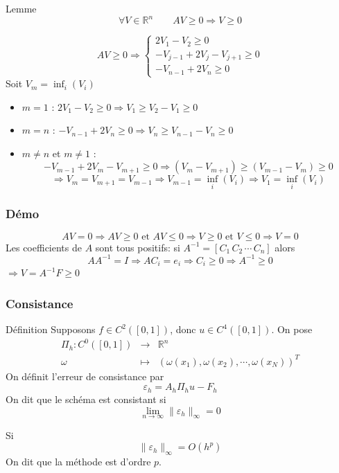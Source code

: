 \documentclass{beamer}
\begin{document}
 \begin{frame}

\begin{block}{Lemme}
\[\forall V \in \mathbb{R}^n\qquad AV\geq 0 \Longrightarrow V\geq 0\]
\end{block}
\[  AV\geq 0 \Longrightarrow
 \left\{
 \begin{array}{l}
2V_1-V_2\geq 0\\
-V_{j-1}+2V_j-V_{j+1}\geq 0\\
-V_{n-1}+2V_n\geq 0
\end{array}
\right.
 \]
Soit $V_m=\inf_i(V_i)$
\begin{itemize}
\item $m=1$ : $2V_1-V_2\geq 0 \Longrightarrow V_1\geq V_2-V_1\geq 0 $
\item $m=n$ : $-V_{n-1}+2V_n \geq 0 \Longrightarrow V_n\geq V_{n-1}-V_n\geq 0 $
\item $m\neq n$ et $m \neq 1$ : 
\[-V_{m-1}+2V_m-V_{m+1}\geq 0  \Longrightarrow (V_m-V_{m+1})\geq (V_{m-1}-V_m)\geq 0\]
\[ \Longrightarrow V_m=V_{m+1}=V_{m-1} \Longrightarrow V_{m-1}=\inf_i(V_i)\Longrightarrow V_1=\inf_i(V_i)\]
\end{itemize}


\end{frame}

\begin{frame}
  \frametitle{Démo}
  \[AV=0 \Longrightarrow AV\geq 0 \mbox { et } AV\leq 0\Longrightarrow V\geq 0 \mbox { et } V\leq 0\Longrightarrow V=0\]
  Les coefficients de $A$ sont tous positifs: si $A^{-1}=[C_1\,C_2\,\cdots\,C_n]$ alors
  \[ A A^{-1}=I  \Longrightarrow A C_i =e_i \Longrightarrow C_i\geq 0 \Longrightarrow  A^{-1}\geq 0 \]
  $\Longrightarrow V = A^{-1}F\geq 0$
  
  
 \end{frame} 
  
  \begin{frame}
  \frametitle{Consistance}
  \begin{block}{Définition}
  Supposons $f\in C^2([0,1])$, donc $u\in C^4([0,1])$. On pose
  \[\begin{array}{ccc}
   \Pi_h:C^0([0,1])&\to &\mathbb{R}^n\\
  \omega&\mapsto &(\omega(x_1),\omega(x_2),\cdots,\omega(x_N))^T
  \end{array}\]
  On définit l'erreur de consistance par
  \[\varepsilon_h=A_h\Pi_h u-F_h\]
  On dit que le schéma est consistant si \[\lim_{n\to\infty}\|\varepsilon_h\|_{\infty}=0\]
  
  Si \[\|\varepsilon_h\|_{\infty} = O(h^p)\] On dit que la méthode est d'ordre $p$.
  \end{block}
  
 \end{frame} 
\end{document}
